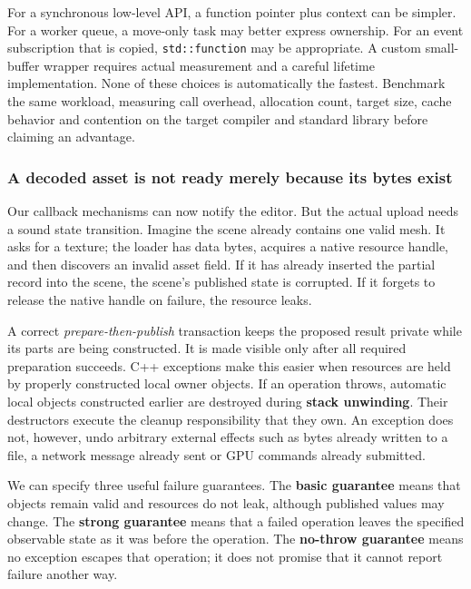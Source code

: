 For a synchronous low-level API, a function pointer plus context can be simpler. For a worker queue, a move-only task may better express ownership. For an event subscription that is copied, \texttt{std::function} may be appropriate. A custom small-buffer wrapper requires actual measurement and a careful lifetime implementation. None of these choices is automatically the fastest. Benchmark the same workload, measuring call overhead, allocation count, target size, cache behavior and contention on the target compiler and standard library before claiming an advantage.

\subsubsection{A decoded asset is not ready merely because its bytes exist}\label{a-decoded-asset-is-not-ready-merely-because-its-bytes-exist}

Our callback mechanisms can now notify the editor. But the actual upload needs a sound state transition. Imagine the scene already contains one valid mesh. It asks for a texture; the loader has data bytes, acquires a native resource handle, and then discovers an invalid asset field. If it has already inserted the partial record into the scene, the scene's published state is corrupted. If it forgets to release the native handle on failure, the resource leaks.

A correct \emph{prepare-then-publish} transaction keeps the proposed result private while its parts are being constructed. It is made visible only after all required preparation succeeds. C++ exceptions make this easier when resources are held by properly constructed local owner objects. If an operation throws, automatic local objects constructed earlier are destroyed during \textbf{stack unwinding}. Their destructors execute the cleanup responsibility that they own. An exception does not, however, undo arbitrary external effects such as bytes already written to a file, a network message already sent or GPU commands already submitted.

We can specify three useful failure guarantees. The \textbf{basic guarantee} means that objects remain valid and resources do not leak, although published values may change. The \textbf{strong guarantee} means that a failed operation leaves the specified observable state as it was before the operation. The \textbf{no-throw guarantee} means no exception escapes that operation; it does not promise that it cannot report failure another way.


